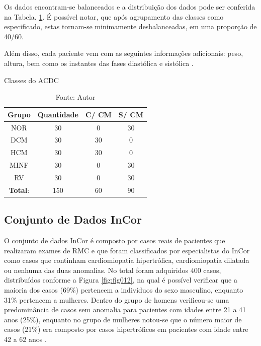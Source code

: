 Os dados encontram-se balanceados e a distribuição dos dados pode ser conferida na Tabela. \ref{tab:count_dataset}. É possível notar, que após agrupamento das classes como especificado, estas tornam-se minimamente desbalanceadas, em uma proporção de 40/60.

Além disso, cada paciente vem com as seguintes informações adicionais: peso, altura, bem como os instantes das fases diastólica e sistólica \cite{bernardDeepLearningTechniques2018a}.

\begin{table}[hbtp]
    \centering
    \caption{Classes do ACDC}
    \renewcommand{\arraystretch}{1} %
    \begin{tabular}{|c|c|c|c|}
    \hline 
          \textbf{Grupo} & \textbf{Quantidade} & \textbf{C/ CM} & \textbf{S/ CM}  \\ 
    \hline 
        NOR & 30 & 0 & 30 \\ 
        DCM & 30 & 30 & 0\\ 
        HCM & 30 & 30 & 0\\ 
        MINF & 30 & 0 & 30 \\ 
        RV & 30 & 0 & 30 \\
    \hline 
        \textbf{Total}: & 150  & 60 & 90\\ 
    \hline 
    \end{tabular} 
    \caption*{Fonte: Autor}
    \label{tab:count_dataset}
\end{table}

\subsection{Conjunto de Dados InCor} 
\label{subsec:cap4_incor}

O conjunto de dados \gls{InCor} é composto por casos reais de pacientes que realizaram exames de \gls{RMC} e que foram classificados por especialistas do \gls{InCor} como casos que continham cardiomiopatia hipertrófica, cardiomiopatia dilatada ou nenhuma das duas anomalias. No total foram adquiridos $400$ casos, distribuídos conforme a Figura \ref{fig:fig012}, na qual é possível verificar que a maioria dos casos (69\%) pertencem a indivíduos do sexo masculino, enquanto 31\% pertencem a mulheres. Dentro do grupo de homens verificou-se uma predominância de casos sem anomalia para pacientes com idades entre 21 a 41 anos (25\%), enquanto no grupo de mulheres notou-se que o número maior de casos (21\%) era composto por casos hipertróficos em pacientes com idade entre 42 a 62 anos \cite{bergamascoRECUPERACAOOBJETOSMEDICOS2018}.

